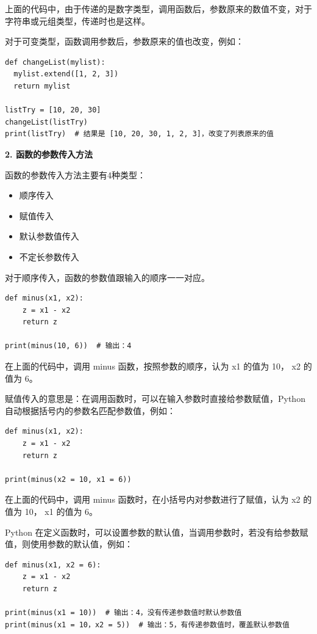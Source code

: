 上面的代码中，由于传递的是数字类型，调用函数后，参数原来的数值不变，对于字符串或元组类型，传递时也是这样。

对于可变类型，函数调用参数后，参数原来的值也改变，例如：

\begin{lstlisting}[Language=Python]
def changeList(mylist):
  mylist.extend([1, 2, 3])
  return mylist

listTry = [10, 20, 30]
changeList(listTry)
print(listTry)  # 结果是 [10, 20, 30, 1, 2, 3]，改变了列表原来的值

\end{lstlisting}

\noindent\textbf{2. 函数的参数传入方法}

函数的参数传入方法主要有4种类型：

\begin{itemize}
  \item 顺序传入
  \item 赋值传入
  \item 默认参数值传入
  \item 不定长参数传入
\end{itemize}

对于顺序传入，函数的参数值跟输入的顺序一一对应。
\begin{lstlisting}[Language=Python]
def minus(x1, x2):
    z = x1 - x2
    return z

print(minus(10, 6))  # 输出：4
\end{lstlisting}

在上面的代码中，调用 minus 函数，按照参数的顺序，认为 x1 的值为 10， x2 的值为 6。

赋值传入的意思是：在调用函数时，可以在输入参数时直接给参数赋值，Python 自动根据括号内的参数名匹配参数值，例如：

\begin{lstlisting}[Language=Python]
def minus(x1, x2):
    z = x1 - x2
    return z

print(minus(x2 = 10, x1 = 6))
\end{lstlisting}

在上面的代码中，调用 minus 函数时，在小括号内对参数进行了赋值，认为 x2 的值为 10， x1 的值为 6。


Python 在定义函数时，可以设置参数的默认值，当调用参数时，若没有给参数赋值，则使用参数的默认值，例如：

\begin{lstlisting}[Language=Python]
def minus(x1, x2 = 6):
    z = x1 - x2
    return z

print(minus(x1 = 10))  # 输出：4，没有传递参数值时默认参数值
print(minus(x1 = 10，x2 = 5))  # 输出：5，有传递参数值时，覆盖默认参数值
\end{lstlisting}

